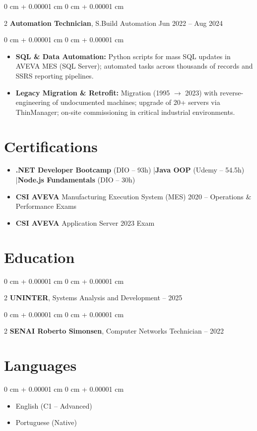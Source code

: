 \documentclass[10pt, letterpaper]{article}
\newenvironment{highlights}{ \begin{itemize}[ topsep=0.10 cm, parsep=0.10 cm, partopsep=0pt,
itemsep=0pt, leftmargin=0 cm + 10pt ] }{ \end{itemize} }
\newenvironment{onecolentry}{ \begin{adjustwidth}{ 0 cm + 0.00001 cm }{ 0 cm + 0.00001 cm }
}{ \end{adjustwidth} }
\newenvironment{twocolentry}[2][]{ \onecolentry \def\secondColumn{#2} \setcolumnwidth{\fill, 4.5 cm}
\begin{paracol}{2} }{ \switchcolumn \raggedleft \secondColumn \end{paracol}
\endonecolentry }
\begin{document}
	\vspace{0.2 cm}

	\begin{twocolentry}
		{ Jun 2022 -- Aug 2024 } \textbf{Automation Technician}, S.Build Automation
	\end{twocolentry}

	\vspace{0.10 cm}
	\begin{onecolentry}
		\begin{highlights}
			\item \textbf{SQL \& Data Automation:} Python scripts for mass SQL updates in AVEVA MES (SQL Server); automated tasks across thousands of records and SSRS reporting pipelines.
			\item \textbf{Legacy Migration \& Retrofit:} Migration (1995 $\rightarrow$ 2023) with reverse-engineering of undocumented machines; upgrade of 20+ servers via ThinManager; on-site commissioning in critical industrial environments.
		\end{highlights}
	\end{onecolentry}

	\section{Certifications}

	\begin{highlights}
		\item \textbf{.NET Developer Bootcamp} (DIO -- 93h) \quad|\quad \textbf{Java OOP} (Udemy -- 54.5h) \quad|\quad \textbf{Node.js Fundamentals} (DIO -- 30h)
		\item \textbf{CSI AVEVA} Manufacturing Execution System (MES) 2020 -- Operations \& Performance Exams
		\item \textbf{CSI AVEVA} Application Server 2023 Exam
	\end{highlights}

	\section{Education}

	\begin{twocolentry}
		{2023 -- 2025} \textbf{UNINTER}, Systems Analysis and Development
	\end{twocolentry}

	\begin{twocolentry}
		{2021 -- 2022} \textbf{SENAI Roberto Simonsen}, Computer Networks Technician
	\end{twocolentry}

	\section{Languages}

	\begin{onecolentry}
		\begin{highlights}
			\item English (C1 -- Advanced)
			\item Portuguese (Native)
		\end{highlights}
	\end{onecolentry}
\end{document}
